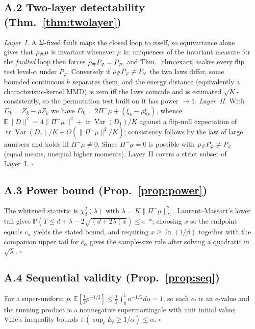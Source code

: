 \subsection*{A.2 Two-layer detectability (Thm.~\ref{thm:twolayer})}
\emph{Layer~I.} A $\Sigma$-fixed fault maps the closed loop to itself, so equivariance alone gives that
${\rho}_{\#}\mu$ is invariant whenever $\mu$ is; uniqueness of the invariant measure for the \emph{faulted} loop then
forces ${\rho}_{\#}P_\varphi=P_\varphi$, and Thm.~\ref{thm:exact} makes every flip test level-$\alpha$ under
$P_\varphi$. Conversely if ${\rho}_{\#}P_\varphi\ne P_\varphi$ the two laws differ, some bounded continuous $h$
separates them, and the energy distance (equivalently a characteristic-kernel MMD) is zero iff the laws coincide and is
estimated $\sqrt K$-consistently, so the permutation test built on it has power $\to1$.
\emph{Layer~II.} With $D_k=Z_k-\rho Z_k$ we have $D_k = 2\Pi^-\mu + (\xi_k-\rho\xi_k)$, whence
$\mathbb{E}\|\bar D\|^2 = 4\|\Pi^-\mu\|^2 + \operatorname{tr}\operatorname{Var}(D_1)/K$ against a flip-null expectation
of $\operatorname{tr}\operatorname{Var}(D_1)/K + O(\|\Pi^-\mu\|^2/K)$; consistency follows by the law of large numbers
and holds iff $\Pi^-\mu\ne0$. Since $\Pi^-\mu=0$ is possible with ${\rho}_{\#}P_\varphi\ne P_\varphi$ (equal means,
unequal higher moments), Layer~II covers a strict subset of Layer~I. \hfill$\square$

\subsection*{A.3 Power bound (Prop.~\ref{prop:power})}
The whitened statistic is $\chi^2_d(\lambda)$ with $\lambda=K\|\Pi^-\mu\|^2_\Sigma$. Laurent--Massart's lower tail gives
$\mathbb{P}(T\le d+\lambda-2\sqrt{(d+2\lambda)x})\le e^{-x}$; choosing $x$ so the endpoint equals $c_\alpha$ yields the
stated bound, and requiring $x\ge\ln(1/\beta)$ together with the companion upper tail for $c_\alpha$ gives the
sample-size rule after solving a quadratic in $\sqrt\lambda$. \hfill$\square$

\subsection*{A.4 Sequential validity (Prop.~\ref{prop:seq})}
For a super-uniform $p$, $\mathbb{E}[\tfrac12p^{-1/2}]\le\tfrac12\int_0^1u^{-1/2}du=1$, so each $e_t$ is an $e$-value and
the running product is a nonnegative supermartingale with unit initial value; Ville's inequality bounds
$\mathbb{P}(\sup_t E_t\ge1/\alpha)\le\alpha$. \hfill$\square$

